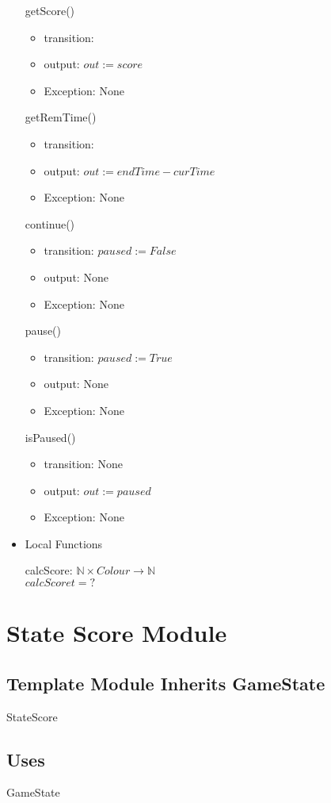 \documentclass[11pt]{article}
\begin{document}
\begin{itemize}
getScore()
\begin{itemize}
\item transition:
\item output: \(out := score\)
\item Exception: None
\end{itemize}

getRemTime()
\begin{itemize}
\item transition:
\item output: \(out := endTime - curTime\)
\item Exception: None
\end{itemize}

continue()
\begin{itemize}
\item transition: \(paused := False\)
\item output: None
\item Exception: None
\end{itemize}

pause()
\begin{itemize}
\item transition: \(paused := True\)
\item output: None
\item Exception: None
\end{itemize}

isPaused()
\begin{itemize}
\item transition: None
\item output: \(out := paused\)
\item Exception: None
\end{itemize}

\item Local Functions
\label{sec:org15a0483}

calcScore: \(\mathbb{N} \times Colour \rightarrow \mathbb{N}\) \\
\(calcScore t = ?\)
\end{itemize}
\section{State Score Module}
\label{sec:org2abf7a5}
\subsection*{Template Module Inherits GameState}
\label{sec:org48883a2}
StateScore
\subsection*{Uses}
\label{sec:org03a5903}
GameState
\end{document}
